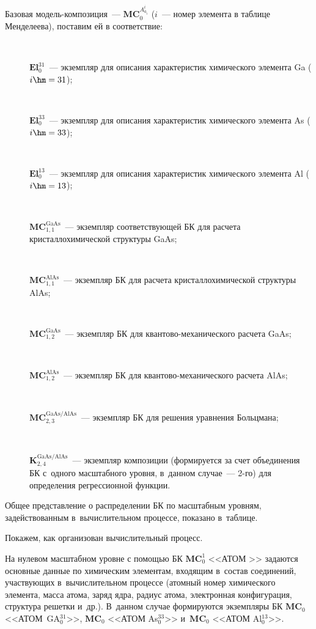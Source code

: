 \begin{multicols}{2}
    Базовая модель-ком\-по\-зи\-ция~--- $\mathbf{MC}_0^{A^i_{a_i}}$ 
($i$~--- номер элемента в таблице Менделеева), поставим ей в соответствие:
    \begin{description}
    \item[\,] $\mathbf{El}_0^{31}$~--- экземпляр для описания характеристик 
химического элемента Ga ($i\hm =31$);
     \item [\,] $\mathbf{El}_0^{33}$~--- экземпляр для описания характеристик химического 
элемента As ($i\hm=33$);
     \item[\,] $\mathbf{El}_0^{13}$~--- экземпляр для описания характеристик химического 
элемента Al ($i\hm=13$);
     \item[\,] $\mathbf{MC}_{1,1}^{\mathrm{GaAs}}$~--- экземпляр 
соответствующей БК для расчета кристаллохимической структуры GaAs; 
     \item[\,] $\mathbf{MC}_{1,1}^{\mathrm{AlAs}}$~--- экземпляр БК для расчета 
кристаллохимической структуры AlAs; 
    \item[\,] $\mathbf{MC}_{1,2}^{\mathrm{GaAs}}$~--- экземпляр БК для  
кван\-то\-во-ме\-ха\-ни\-че\-ско\-го расчета GaAs; 
     \item[\,] $\mathbf{MC}_{1,2}^{\mathrm{AlAs}}$~--- экземпляр БК для  
кван\-то\-во-ме\-ха\-ни\-че\-ско\-го расчета AlAs;
     \item[\,] $\mathbf{MC}_{2,3}^{\mathrm{GaAs/AlAs}}$~--- экземпляр БК для 
решения уравнения Больцмана;
     \item[\,] $\boldsymbol {K}_{2,4}^{\mathrm{GaAs/AlAs}}$~--- экземпляр композиции 
(формируется за счет объединения БК с~одного масштабного уровня, в~данном случае~--- 2-го) 
для определения регрессионной функции.
     \end{description}
    
     Общее представление о распределении БК 
     по масштабным уровням, задействованным в~вы\-чис\-ли\-тель\-ном процессе, 
показано в~таблице.
     
    
     
    Покажем, как организован вычислительный процесс.
    
    На нулевом масштабном уровне с помощью БК
    $\mathbf{MC}_0^1$ <<АТОМ  >> задаются основные данные по 
химическим элементам, входящим в~состав соединений, участвующих 
в~вы\-чис\-ли\-тель\-ном процессе (атомный номер химического элемента, масса атома, 
заряд ядра, радиус атома, электронная конфигурация, структура решетки и~др.). 
В~данном случае формируются экземпляры БК $\mathbf{MC}_0$ <<АТОМ~GA$_0^{31}$>>, 
$\mathbf{MC}_0$ <<АТОМ As$_0^{33}$>> и~$\mathbf{MC}_0$ <<АТОМ Al$_0^{13}$>>.
     

\end{multicols}
